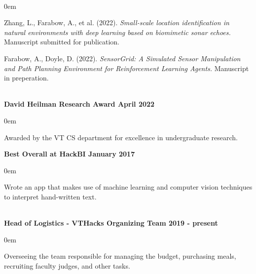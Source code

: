 \documentclass{article}
\begin{document}
\begin{center}
\begin{flushleft}
    {\large\textbf{\underline{}}} \\
    \begin{compactitem}
      \itemsep0em
      \item Zhang, L., Farabow, A., et al. (2022). \emph{Small-scale location identification in natural environments with deep learning based on biomimetic sonar echoes.} Manuscript submitted for publication. \\
      \item Farabow, A., Doyle, D. (2022). \emph{SensorGrid: A Simulated Sensor Manipulation and Path Planning Environment for Reinforcement Learning Agents.} Manuscript in preperation. 
    \end{compactitem}

    {\large\textbf{\underline{}}} \\
    \textbf{David Heilman Research Award \hfill April 2022}
    \begin{compactitem}
      \itemsep0em
      \item Awarded by the VT CS department for excellence in undergraduate research.
    \end{compactitem}

    \textbf{Best Overall at HackBI \hfill January 2017}
    \begin{compactitem}
      \itemsep0em
      \item Wrote an app that makes use of machine learning and computer vision techniques to interpret hand-written text.
    \end{compactitem}


    {\large\textbf{\underline{}}} \\

    \textbf{Head of Logistics - VTHacks Organizing Team \hfill 2019 - present}
    \begin{compactitem}
      \itemsep0em
      \item Overseeing the team responsible for managing the budget, purchasing meals, recruiting faculty judges, and other tasks.
    \end{compactitem}


\end{flushleft}
\end{center}
\end{document}
